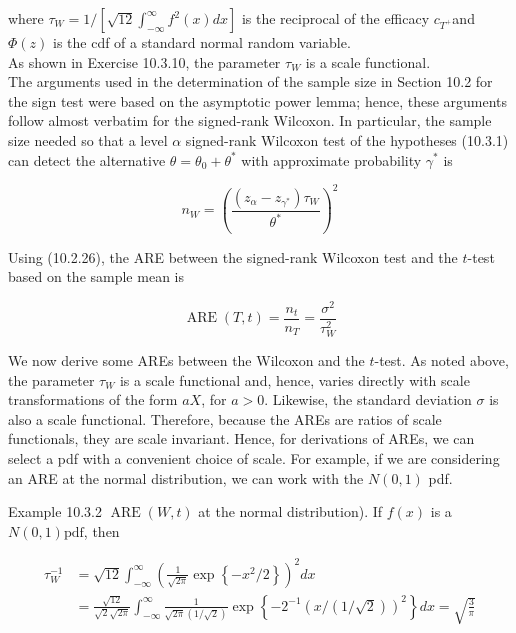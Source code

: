 where $\tau_{W}=1 /\left[\sqrt{12} \int_{-\infty}^{\infty} f^{2}(x) d x\right]$ is the reciprocal of the efficacy $c_{T^{+}}$and $\Phi(z)$ is the cdf of a standard normal random variable.\\
As shown in Exercise 10.3.10, the parameter $\tau_{W}$ is a scale functional.\\
The arguments used in the determination of the sample size in Section 10.2 for the sign test were based on the asymptotic power lemma; hence, these arguments follow almost verbatim for the signed-rank Wilcoxon. In particular, the sample size needed so that a level $\alpha$ signed-rank Wilcoxon test of the hypotheses (10.3.1) can detect the alternative $\theta=\theta_{0}+\theta^{*}$ with approximate probability $\gamma^{*}$ is


\begin{equation*}
n_{W}=\left(\frac{\left(z_{\alpha}-z_{\gamma^{*}}\right) \tau_{W}}{\theta^{*}}\right)^{2} \tag{10.3.27}
\end{equation*}


Using (10.2.26), the ARE between the signed-rank Wilcoxon test and the $t$-test based on the sample mean is


\begin{equation*}
\operatorname{ARE}(T, t)=\frac{n_{t}}{n_{T}}=\frac{\sigma^{2}}{\tau_{W}^{2}} \tag{10.3.28}
\end{equation*}


We now derive some AREs between the Wilcoxon and the $t$-test. As noted above, the parameter $\tau_{W}$ is a scale functional and, hence, varies directly with scale transformations of the form $a X$, for $a>0$. Likewise, the standard deviation $\sigma$ is also a scale functional. Therefore, because the AREs are ratios of scale functionals, they are scale invariant. Hence, for derivations of AREs, we can select a pdf with a convenient choice of scale. For example, if we are considering an ARE at the normal distribution, we can work with the $N(0,1)$ pdf.

Example 10.3.2 $\operatorname{ARE}(W, t)$ at the normal distribution). If $f(x)$ is a $N(0,1) \mathrm{pdf}$, then

$$
\begin{aligned}
\tau_{W}^{-1} & =\sqrt{12} \int_{-\infty}^{\infty}\left(\frac{1}{\sqrt{2 \pi}} \exp \left\{-x^{2} / 2\right\}\right)^{2} d x \\
& =\frac{\sqrt{12}}{\sqrt{2} \sqrt{2 \pi}} \int_{-\infty}^{\infty} \frac{1}{\sqrt{2 \pi}(1 / \sqrt{2})} \exp \left\{-2^{-1}(x /(1 / \sqrt{2}))^{2}\right\} d x=\sqrt{\frac{3}{\pi}}
\end{aligned}
$$

